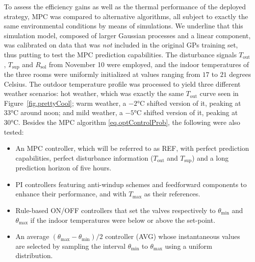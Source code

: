 To assess the efficiency gains as well as the thermal performance of the deployed strategy, MPC was compared to alternative algorithms, all subject to exactly the same environmental conditions by means of simulations. We underline that this simulation model, composed of larger Gaussian processes and a linear component, was calibrated on data that was \textit{not} included in the original GPs training set, thus putting to test the MPC prediction capabilities. The disturbance signals $T_\text{out}$, $T_\text{sup}$ and $R_\text{sol}$ from November 10 were employed, and the indoor temperatures of the three rooms were uniformly initialized at values ranging from $17$ to $21$ degrees Celsius. The outdoor temperature profile was processed to yield three different weather scenarios: hot weather, which was exactly the same $T_\text{out}$ curve seen in Figure~\ref{fig.prettyCool}; warm weather, a $-2$°C shifted version of it, peaking at 33°C around noon; and mild weather, a $-5$°C shifted version of it, peaking at 30°C. Besides the MPC algorithm \eqref{eq.optControlProb}, the following were also tested:
\begin{itemize}
	\item An MPC controller, which will be referred to as REF, with perfect prediction capabilities, perfect disturbance information ($T_\text{out}$ and $T_\text{sup}$) and a long prediction horizon of five hours.
	\item PI controllers featuring anti-windup schemes and feedforward components to enhance their performance, and with $T_\text{max}$ as their references.
	\item Rule-based ON/OFF controllers that set the valves respectively to $\theta_\text{min}$ and $\theta_\text{max}$ if the indoor temperatures were below or above the set-point. 
	\item An average $(\theta_\text{max}-\theta_\text{min})/2$ controller (AVG) whose instantaneous values are selected by sampling the interval $\theta_\text{min}$ to $\theta_\text{max}$ using a uniform distribution.
\end{itemize}

